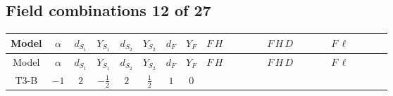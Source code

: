 \documentclass[8pt]{article}
\begin{document}
\begin{landscape}
\subsection*{Field combinations 12 of 27}
\begin{longtable}{@{}cccccccc >{\raggedright\arraybackslash}p{0.21\linewidth} >{\raggedright\arraybackslash}p{0.21\linewidth} >{\raggedright\arraybackslash}p{0.21\linewidth}@{}}
\toprule
Model & $\alpha$ & $d_{S_1}$ & $Y_{S_1}$ & $d_{S_2}$ & $Y_{S_2}$ & $d_F$ & $Y_F$ & $F\,H$ & $F\,H\,D$ & $F\,\ell$ \\
\midrule
\endfirsthead
\toprule
Model & $\alpha$ & $d_{S_1}$ & $Y_{S_1}$ & $d_{S_2}$ & $Y_{S_2}$ & $d_F$ & $Y_F$ & $F\,H$ & $F\,H\,D$ & $F\,\ell$ \\
\midrule
\endhead
T3-B & $-1$ & $2$ & $-\frac{1}{2}$ & $2$ & $\frac{1}{2}$ & $1$ & $0$ & \scriptsize\adjustbox{max width=\linewidth}{$\begin{gathered} +\frac{\hbar  \overline{y_{1,i_1,r_1}} F_{r_1}{}^T\, C\, P_R\, F_{r_2} g_1^2 H_{a_1} M_F y_{1,i_1,r_2} H_{a_1}{}^{\dagger }}{6 \epsilon  m_1^2} \\ +\frac{\hbar  \overline{y_{1,i_1,r_1}} F_{r_1}{}^T\, C\, P_R\, F_{r_2} g_1^2 H_{a_1} M_F y_{1,i_1,r_2} H_{a_1}{}^{\dagger }}{4 m_1^2} \\ +\frac{\hbar  \log \left(\frac{\bar{\mu}^{2}}{m_1^2}\right) \overline{y_{1,i_1,r_1}} F_{r_1}{}^T\, C\, P_R\, F_{r_2} g_1^2 H_{a_1} M_F y_{1,i_1,r_2} H_{a_1}{}^{\dagger }}{6 m_1^2}\end{gathered}$} & \scriptsize\adjustbox{max width=\linewidth}{$\begin{gathered} -\frac{i \hbar  \overline{y_{1,i_1,r_2}} F_{r_1}{}^T\, C\, \gamma ^{\mu _1}\, P_L\, D_{\mu _1}\left(F_{r_2}\right) g_1^2 H_{a_1} y_{1,i_1,r_1} H_{a_1}{}^{\dagger }}{6 \epsilon  m_1^2} \\ -\frac{i \hbar  \overline{y_{1,i_1,r_2}} F_{r_1}{}^T\, C\, \gamma ^{\mu _1}\, P_L\, D_{\mu _1}\left(F_{r_2}\right) g_1^2 H_{a_1} y_{1,i_1,r_1} H_{a_1}{}^{\dagger }}{4 m_1^2} \\ -\frac{i \hbar  \log \left(\frac{\bar{\mu}^{2}}{m_1^2}\right) \overline{y_{1,i_1,r_2}} F_{r_1}{}^T\, C\, \gamma ^{\mu _1}\, P_L\, D_{\mu _1}\left(F_{r_2}\right) g_1^2 H_{a_1} y_{1,i_1,r_1} H_{a_1}{}^{\dagger }}{6 m_1^2}\end{gathered}$} & \scriptsize\adjustbox{max width=\linewidth}{$\begin{gathered} -\frac{9 \hbar  \overline{y_{1,i_1,r_2}} \overline{L_{a_1,i_4}}\, \gamma ^{\mu _1}\, P_L\, L_{a_1,i_1} F_{r_2}{}^T\, C\, \gamma ^{\mu _1}\, P_R\, F_{r_3} y_{1,i_4,r_3} g_2^2}{16 m_1^2} \\ -\frac{\hbar  \text{Delta}\left(i_1,i_4\right) \overline{y_{1,i_2,r_2}} \overline{L_{a_1,i_4}}\, \gamma ^{\mu _1}\, P_L\, L_{a_1,i_1} F_{r_2}{}^T\, C\, \gamma ^{\mu _1}\, P_R\, F_{r_3} g_1^2 y_{1,i_2,r_3}}{6 \epsilon  m_1^2} \\ -\frac{\hbar  \text{Delta}\left(i_1,i_4\right) \overline{y_{1,i_2,r_2}} \overline{L_{a_1,i_4}}\, \gamma ^{\mu _1}\, P_L\, L_{a_1,i_1} F_{r_2}{}^T\, C\, \gamma ^{\mu _1}\, P_R\, F_{r_3} g_1^2 y_{1,i_2,r_3}}{4 m_1^2}\end{gathered}$} \\

\end{longtable}
\end{landscape}
\end{document}
